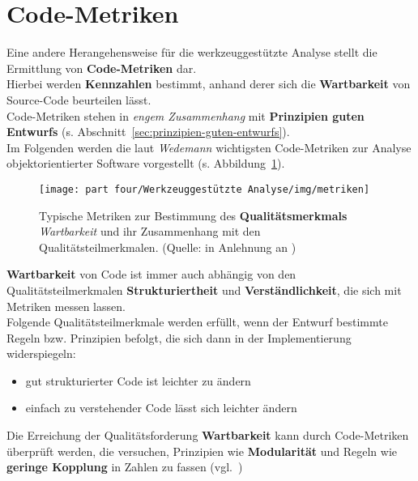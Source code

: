 \section{Code-Metriken}
Eine andere Herangehensweise für die werkzeuggestützte Analyse stellt die Ermittlung von \textbf{Code-Metriken} dar.\\
Hierbei werden \textbf{Kennzahlen} bestimmt, anhand derer sich die \textbf{Wartbarkeit} von Source-Code beurteilen lässt.\\
Code-Metriken stehen in \textit{engem Zusammenhang} mit \textbf{Prinzipien guten Entwurfs} (s. Abschnitt~\ref{sec:prinzipien-guten-entwurfs}).\\
Im Folgenden werden die laut \textit{Wedemann} wichtigsten Code-Metriken zur Analyse objektorientierter Software vorgestellt (s. Abbildung~\ref{fig:metriken}).

\begin{figure}
    \centering
    \texttt{[image: part four/Werkzeuggestützte Analyse/img/metriken]}
    \caption{Typische Metriken zur Bestimmung des \textbf{Qualitätsmerkmals} \textit{Wartbarkeit} und ihr Zusammenhang mit den Qualitätsteilmerkmalen. (Quelle: in Anlehnung an \cite[Abb. 4.3, 37]{Wed09c})}
    \label{fig:metriken}
\end{figure}

\noindent
\textbf{Wartbarkeit} von Code ist immer auch abhängig von den Qualitätsteilmerkmalen \textbf{Strukturiertheit} und \textbf{Verständlichkeit}, die sich mit Metriken messen lassen.\\

\noindent
Folgende Qualitätsteilmerkmale werden erfüllt, wenn der Entwurf bestimmte Regeln bzw. Prinzipien befolgt, die sich dann in der Implementierung widerspiegeln:

\begin{itemize}
    \item gut strukturierter Code ist leichter zu ändern
    \item einfach zu verstehender Code lässt sich leichter ändern
\end{itemize}

\begin{tcolorbox}
    Die Erreichung der Qualitätsforderung \textbf{Wartbarkeit} kann durch Code-Metriken überprüft werden, die versuchen, Prinzipien wie \textbf{Modularität} und Regeln wie \textbf{geringe Kopplung} in Zahlen zu fassen (vgl.~\cite[38]{Wed09c})
\end{tcolorbox}
\vspace{2mm}

